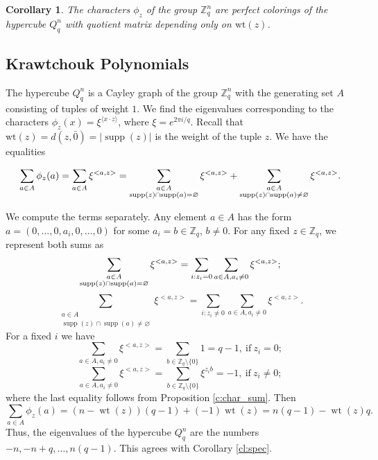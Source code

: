 \documentclass[11pt]{article}
\newtheorem{corollary}{Corollary}[section]
\theoremstyle{definition}
\newcommand{\supp}{{\rm supp}}
\begin{document}
{{{\begin{corollary}
The characters $\phi_z$ of the group $\mathbb{Z}^n_q$ are perfect
colorings of the hypercube $Q_q^n$ with quotient matrix depending
only on $\mathrm{wt}(z)$. \end{corollary}

\subsection{Krawtchouk Polynomials }\label{10.2}


The hypercube $Q_q^n$ is a Cayley graph of the group $\mathbb{Z}^n_q$ with
the generating set $A$ consisting of tuples of weight $1$. We find the
eigenvalues corresponding to the characters
$\phi_z(x)=\xi^{\langle x\cdot z\rangle}$, where $\xi=e^{2\pi i/q}$. Recall that
$\mathrm{wt}(z)=d(z,\bar{0})=|\operatorname{supp}(z)|$ is the weight of the tuple $z$. We have
the equalities


\[
\sum\limits_{a\in A}\phi_z(a)=\sum\limits_{a\in
A}\xi^{<a,z>}=\sum\limits_{\substack{a\in A\\ \supp(z)\cap
\supp(a)=\varnothing}}\xi^{<a,z>}+\sum\limits_{\substack{a\in A\\
\operatorname{supp}(z)\cap \operatorname{supp}(a)\ne\varnothing}}\xi^{<a,z>}.
\]

We compute the terms separately. Any element $a\in A$ has the form
$a=(0,\dots,0,a_i,0,\dots,0)$ for some $a_i=b\in\mathbb{Z}_q$,
$b\neq0$. For any fixed $z\in \mathbb{Z}_q$, we represent
both sums as
\[
\sum\limits_{\substack{a\in A\\  \supp(z)\cap
\supp(a)=\varnothing}}\xi^{<a,z>}=\sum\limits_{i:z_i=0}\sum\limits_{a\in
A, a_i\neq 0}\xi^{<a,z>}; \]
\[
\sum\limits_{\substack{a\in A\\
\operatorname{supp}(z)\cap
\operatorname{supp}(a)\ne\varnothing}}\xi^{<a,z>}=\sum\limits_{i:z_i\neq
0}\sum\limits_{a\in A, a_i\neq 0} \xi^{<a,z>}.\]
For a fixed $i$ we have
\begin{equation}\label{eqsum} \sum\limits_{a\in A, a_i\neq 0}\xi^{<a,z>}=\sum\limits_{b\in
\mathbb{Z}_q\setminus \{0\}}1=q-1,\ \mbox{if}\ z_i=0;
\end{equation}
$$\sum\limits_{a\in A, a_i\neq 0}\xi^{<a,z>}=\sum\limits_{b\in
\mathbb{Z}_q\setminus \{0\}} \xi^{z_i b}=-1,\ \mbox{if}\   z_i\neq
0;$$ where the last equality follows from Proposition
\ref{c:char_sum}. Then
\[
\sum\limits_{a\in
A}\phi_z(a)=(n-\operatorname{wt}(z))(q-1)+(-1)\operatorname{wt}(z)=n(q-1)-\operatorname{wt}(z)q.
\]
Thus, the eigenvalues of the hypercube $Q_q^n$ are the numbers $-n,
-n+q, \dots, n(q-1)$. This agrees with Corollary \ref{cl:spec}.





}}}
\end{document}
